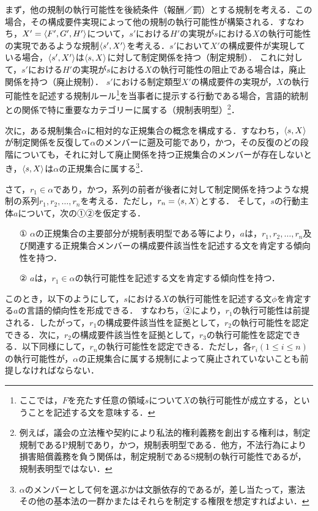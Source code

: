 まず，他の規制の執行可能性を後続条件（報酬／罰）とする規制を考える．この場合，その構成要件実現によって他の規制の執行可能性が構築される．すなわち，$X'=\langle F',G',H' \rangle$について，$s'$における$H'$の実現が$s$における$X$の執行可能性の実現であるような規制$ \langle s',X' \rangle $を考える．$s'$において$X'$の構成要件が実現している場合，$ \langle s',X' \rangle $は$ \langle s,X \rangle $に対して制定関係を持つ（制定規制）．
これに対して，$s'$における$H'$の実現が$s$における$X$の執行可能性の阻止である場合は，廃止関係を持つ（廃止規制）．
$s'$における制定類型$X'$の構成要件の実現が，$X$の執行可能性を記述する規制ルール\footnote{ここでは，$F$を充たす任意の領域$s$について$X$の執行可能性が成立する，ということを記述する文を意味する．}を当事者に提示する行動である場合，言語的統制との関係で特に重要なカテゴリーに属する（規制表明型）\footnote{例えば，議会の立法権や契約により私法的権利義務を創出する権利は，制定規制であるP規制であり，かつ，規制表明型である．他方，不法行為により損害賠償義務を負う関係は，制定規制であるS規制の執行可能性であるが，規制表明型ではない．}．

次に，ある規制集合$\alpha$に相対的な正規集合の概念を構成する．すなわち，$\langle s,X \rangle$が制定関係を反復して$\alpha$のメンバーに遡及可能であり，かつ，その反復のどの段階についても，それに対して廃止関係を持つ正規集合のメンバーが存在しないとき，$\langle s,X \rangle$は$\alpha$の正規集合に属する\footnote{$\alpha$のメンバーとして何を選ぶかは文脈依存的であるが，差し当たって，憲法その他の基本法の一群かまたはそれらを制定する権限を想定すればよい．}．

さて，$r_1\in\alpha$であり，かつ，系列の前者が後者に対して制定関係を持つような規制の系列$r_1,r_2,\dots,r_n$を考える．ただし，$r_n =\langle s,X \rangle$とする．
そして，$s$の行動主体$a$について，次の①②を仮定する．
\begin{enumerate}
    \item[①] $\alpha$の正規集合の主要部分が規制表明型である等により，$a$は，$r_1,r_2,\dots,r_n$及び関連する正規集合メンバーの構成要件該当性を記述する文を肯定する傾向性を持つ．
    \item[②] $a$は，$r_1\in\alpha$の執行可能性を記述する文を肯定する傾向性を持つ．
\end{enumerate}
このとき，以下のようにして，$s$における$X$の執行可能性を記述する文$\phi$を肯定する$a$の言語的傾向性を形成できる．
すなわち，②により，$r_1$の執行可能性は前提される．したがって，$r_1$の構成要件該当性を証拠として，$r_2$の執行可能性を認定できる．次に，$r_2$の構成要件該当性を証拠として，$r_3$の執行可能性を認定できる．以下同様にして，$r_n$の執行可能性を認定できる．ただし，各$r_i(1\leq i\leq n)$の執行可能性が，$\alpha$の正規集合に属する規制によって廃止されていないことも前提しなければならない．
